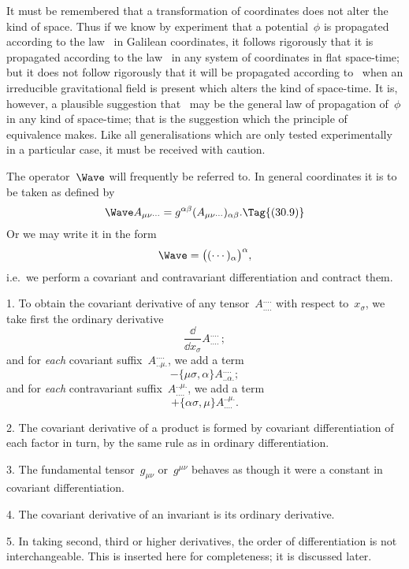 \documentclass[12pt]{book}
\begin{document}
It must be remembered that a transformation of coordinates does not alter
the kind of space. Thus if we know by experiment that a potential~$\phi$ is
propagated according to the law~ in Galilean coordinates, it follows
rigorously that it is propagated according to the law~ in any system of
coordinates in flat space-time; but it does not follow rigorously that it will
be propagated according to~ when an irreducible gravitational field is
present which alters the kind of space-time. It is, however, a plausible
suggestion that ~may be the general law of propagation of~$\phi$ in any kind
of space-time; that is the suggestion which the principle of equivalence makes.
Like all generalisations which are only tested experimentally in a particular
case, it must be received with caution.

The operator~$\Wave$ will frequently be referred to. In general coordinates it
%
%
is to be taken as defined by
\[
\Wave A_{\mu\nu\cdots} = g^{\alpha\beta} (A_{\mu\nu\cdots})_{\alpha\beta}.
\Tag{(30.9)}
\]
Or we may write it in the form
\[
\Wave = \bigl((\cdots)_{\alpha}\bigr)^{\alpha},
\]
i.e.\ we perform a covariant and contravariant differentiation and contract
them.

%
%
%

1. To obtain the covariant derivative of any tensor~$A_{....}^{....}$ with respect to~$x_{\sigma}$,
%
we take first the ordinary derivative
\[
\frac{\dd}{\dd x_{\sigma}} A_{....}^{....}\,;
\]
and for \emph{each} covariant suffix~$A_{..\mu.}^{....}$, we add a term
\[
- \{\mu\sigma, \alpha\} A_{..\alpha.}^{....};
\]
and for \emph{each} contravariant suffix~$A_{....}^{..\mu.}$, we add a term
\[
+ \{\alpha\sigma, \mu\} A_{....}^{..\mu.}.
\]

2. The covariant derivative of a product is formed by covariant differentiation
of each factor in turn, by the same rule as in ordinary differentiation.

3. The fundamental tensor~$g_{\mu\nu}$ or~$g^{\mu\nu}$ behaves as though it were a constant
in covariant differentiation.

4. The covariant derivative of an invariant is its ordinary derivative.

5. In taking second, third or higher derivatives, the order of differentiation
is not interchangeable\footnotemark.\footnotetext
  {This is inserted here for completeness; it is discussed later.}
\end{document}
